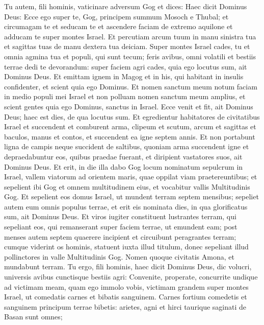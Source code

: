 \begin{biblechapter}  
\verse Tu autem, fili hominis, vaticinare adversum Gog et dices: Haec dicit Dominus Deus: Ecce ego super te, Gog, principem summum Mosoch e Thubal; 
\verse et circumagam te et seducam te et ascendere faciam de extremo aquilone et adducam te super montes Israel. 
\verse Et percutiam arcum tuum in manu sinistra tua et sagittas tuas de manu dextera tua deiciam. 
\verse Super montes Israel cades, tu et omnia agmina tua et populi, qui sunt tecum; feris avibus, omni volatili et bestiis terrae dedi te devorandum: 
\verse super faciem agri cades, quia ego locutus sum, ait Dominus Deus. 
\verse Et emittam ignem in Magog et in his, qui habitant in insulis confidenter, et scient quia ego Dominus. 
\verse Et nomen sanctum meum notum faciam in medio populi mei Israel et non polluam nomen sanctum meum amplius, et scient gentes quia ego Dominus, sanctus in Israel.  
\verse Ecce venit et fit, ait Dominus Deus; haec est dies, de qua locutus sum. 
\verse Et egredientur habitatores de civitatibus Israel et succendent et comburent arma, clipeum et scutum, arcum et sagittas et baculos, manus et contos, et succendent ea igne septem annis. 
\verse Et non portabunt ligna de campis neque succident de saltibus, quoniam arma succendent igne et depraedabuntur eos, quibus praedae fuerant, et diripient vastatores suos, ait Dominus Deus. 
\verse Et erit, in die illa dabo Gog locum nominatum sepulcrum in Israel, vallem viatorum ad orientem maris, quae oppilat viam praetereuntibus; et sepelient ibi Gog et omnem multitudinem eius, et vocabitur vallis Multitudinis Gog. 
\verse Et sepelient eos domus Israel, ut mundent terram septem mensibus; 
\verse sepeliet autem eum omnis populus terrae, et erit eis nominata dies, in qua glorificatus sum, ait Dominus Deus. 
\verse Et viros iugiter constituent lustrantes terram, qui sepeliant eos, qui remanserant super faciem terrae, ut emundent eam; post menses autem septem quaerere incipient 
\verse et circuibunt peragrantes terram; cumque viderint os hominis, statuent iuxta illud titulum, donec sepeliant illud pollinctores in valle Multitudinis Gog. 
\verse Nomen quoque civitatis Amona, et mundabunt terram. 
\verse Tu ergo, fili hominis, haec dicit Dominus Deus, dic volucri, universis avibus cunctisque bestiis agri: Convenite, properate, concurrite undique ad victimam meam, quam ego immolo vobis, victimam grandem super montes Israel, ut comedatis carnes et bibatis sanguinem. 
\verse Carnes fortium comedetis et sanguinem principum terrae bibetis: arietes, agni et hirci taurique saginati de Basan sunt omnes; 

\end{biblechapter}
